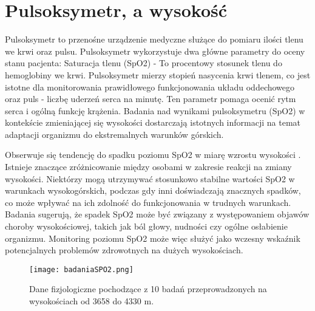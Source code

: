 \section{Pulsoksymetr, a wysokość}
Pulsoksymetr to przenośne urządzenie medyczne służące do pomiaru ilości tlenu we krwi oraz pulsu. Pulsoksymetr wykorzystuje dwa główne parametry do oceny stanu pacjenta: Saturacja tlenu (SpO2) - To procentowy stosunek tlenu do hemoglobiny we krwi. Pulsoksymetr mierzy stopień nasycenia krwi tlenem, co jest istotne dla monitorowania prawidłowego funkcjonowania układu oddechowego oraz puls - liczbę uderzeń serca na minutę. Ten parametr pomaga ocenić rytm serca i ogólną funkcję krążenia. Badania nad wynikami pulsoksymetru (SpO2) w kontekście zmieniającej się wysokości dostarczają istotnych informacji na temat adaptacji organizmu do ekstremalnych warunków górskich.

Obserwuje się tendencję do spadku poziomu SpO2 w miarę wzrostu wysokości \cite{spo2}. Istnieje znaczące zróżnicowanie między osobami w zakresie reakcji na zmiany wysokości. Niektórzy mogą utrzymywać stosunkowo stabilne wartości SpO2 w warunkach wysokogórskich, podczas gdy inni doświadczają znacznych spadków, co może wpływać na ich zdolność do funkcjonowania w trudnych warunkach. Badania sugerują, że spadek SpO2 może być związany z występowaniem objawów choroby wysokościowej, takich jak ból głowy, nudności czy ogólne osłabienie organizmu. Monitoring poziomu SpO2 może więc służyć jako wczesny wskaźnik potencjalnych problemów zdrowotnych na dużych wysokościach.

\begin{figure}[!htb]
    \centering
    \texttt{[image: badaniaSPO2.png]}
    \caption{Dane fizjologiczne pochodzące z 10 badań przeprowadzonych na wysokościach od 3658 do 4330 m. \cite{badaniaSPO2}}
\end{figure}